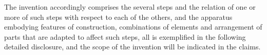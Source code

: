 

\npar The invention accordingly comprises the several steps and the relation of one or more of such steps with respect to each of the others, and the apparatus embodying features of construction, combinations of elements and arrangement of parts that are adapted to affect such steps, all is exemplified in the following detailed disclosure, and the scope of the invention will be indicated in the claims.
